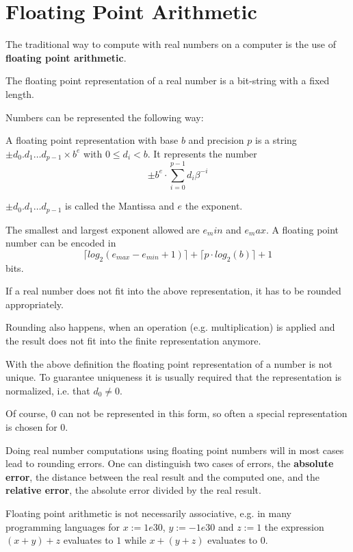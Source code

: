 \section{Floating Point Arithmetic}
The traditional way to compute with real numbers on a computer is the use 
of \textbf{floating point arithmetic}. 

The floating point representation of a real number is a bit-string with a  fixed
length.

Numbers can be represented the following way:
\begin{definition}\label{def: floating point number}
	A floating point representation with base $b$ and precision $p$
	is a string $\pm d_0 . d_1 \dots d_{p-1} \times b^e$ with $0 \leq d_i < b$.	
	It represents the number
	$$ \pm b^e \cdot \sum_{i=0}^{p-1} d_i\beta^{-i} $$ 

	$\pm d_0 . d_1 \dots d_{p-1}$ is called the Mantissa and $e$ the exponent.
	
	The smallest and largest exponent allowed are $e_min$ and $e_max$.
	A floating point number can be encoded in
	$$ \lceil log_2(e_{max}-e_{min}+1) \rceil + \lceil  p \cdot log_2 (b) \rceil + 1 $$
	bits.
\end{definition}
If a real number does not fit into the above representation, it has to be
rounded appropriately.

Rounding also happens, when an operation (e.g. multiplication) is applied and
the result does not fit into the finite representation anymore.

With the above definition the floating point representation of a number is not
unique. 
To guarantee uniqueness it is usually required that the representation  is normalized, i.e. that $d_0 \neq 0$. 

Of course, $0$ can not be represented in this form, so often a special
representation is chosen for $0$.

Doing real number computations using floating point numbers will in most cases
lead to rounding errors.
One can distinguish two cases of errors, the \textbf{absolute error}, the
distance between the real result and the computed one, and the \textbf{relative
error}, the absolute error divided by the real result.

Floating point arithmetic is not necessarily associative, e.g. in many
programming languages for $x := 1e30$, $y := -1e30$ and $z := 1$ the expression
$(x+y)+z$ evaluates to $1$ while $x+(y+z)$ evaluates to $0$.
